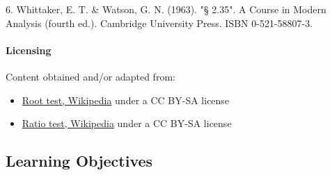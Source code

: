 6.  Whittaker, E. T. \& Watson, G. N. (1963). "§ 2.35". A Course in Modern Analysis (fourth ed.). Cambridge University Press. ISBN 0-521-58807-3.



\paragraph{Licensing}



Content obtained and/or adapted from:



\begin{itemize}
    \item \href{https://en.wikipedia.org/wiki/Root_test}{Root test, Wikipedia} under a CC BY-SA license
    \item \href{https://en.wikipedia.org/wiki/Ratio_test}{Ratio test, Wikipedia} under a CC BY-SA license
\end{itemize}

\subsection{Learning Objectives}


